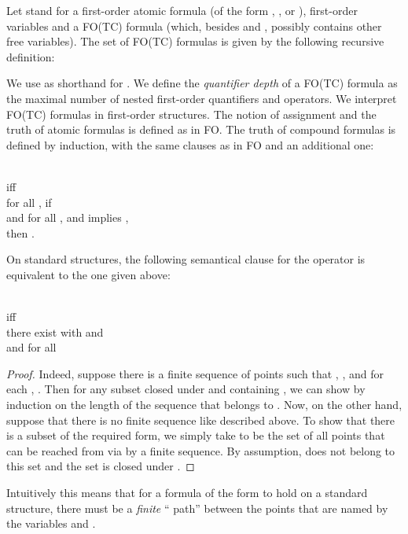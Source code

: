 \documentclass{LMCS}
\newcommand{\fo}{\textsf{FO}\xspace}
\newcommand{\fotc}{\textsf{FO(TC)}\xspace}
\begin{document}
\begin{defi}
[Syntax and semantics of \fotc]
    Let  stand for a first-order atomic formula  (of the form
    , , or ),  first-order variables and  a \fotc formula (which, besides  and
    , possibly contains other free variables). The set of \fotc
    formulas is given by the following recursive definition:

We use  as shorthand for .
We define the \textit{quantifier depth} of a \fotc formula as the maximal
number of nested first-order quantifiers and  operators.
We interpret \fotc formulas in first-order structures. The notion of assignment and the truth of atomic formulas is defined as in \fo. The truth of compound formulas is defined by induction, with the same clauses as in \fo and an additional one:
\begin{center}
\\
iff\\
for all , if \\
and for all ,  and  implies ,\\
then .
\end{center}
\label{deftc}
\end{defi}


\begin{prop}
On standard structures, the following semantical clause for the  operator is equivalent to the one given above:
\begin{center}
\\
iff\\
there exist  with  and \\
and  for all 
\end{center}
\label{tcaltsem}
\end{prop}
\begin{proof}
Indeed, suppose there is a finite sequence of points  such that , , and for each ,
. Then for any subset
 closed under  and containing , we can show by
induction on the length of the sequence  that
 belongs to . Now, on the other hand, suppose that there
is no finite sequence like described above. To show that there is
a subset  of the required form, we simply take  to be the
set of all points that can be reached from  via  by a
finite sequence. By assumption,  does not belong to this set
and the set is closed under .
\end{proof}

Intuitively this means that for a formula of the form  to hold on a standard structure, there must be a
\emph{finite} `` path'' between the points that are named
by the variables  and .
\end{document}
